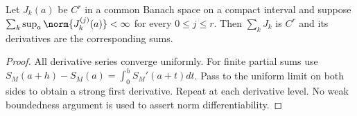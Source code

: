 \begin{lemma}\label{lem:sum}
Let $J_k(a)$ be $C^r$ in a common Banach space on a compact interval and suppose
$\sum_k\sup_a\norm{J_k^{(j)}(a)}<\infty$ for every $0\le j\le r$. Then $\sum_kJ_k$ is $C^r$ and its derivatives are the corresponding sums.
\end{lemma}
\begin{proof}
All derivative series converge uniformly. For finite partial sums use
$S_M(a+h)-S_M(a)=\int_0^hS_M'(a+t)dt$. Pass to the uniform limit on both sides to obtain a strong first derivative. Repeat at each derivative level. No weak boundedness argument is used to assert norm differentiability.
\end{proof}
\par
